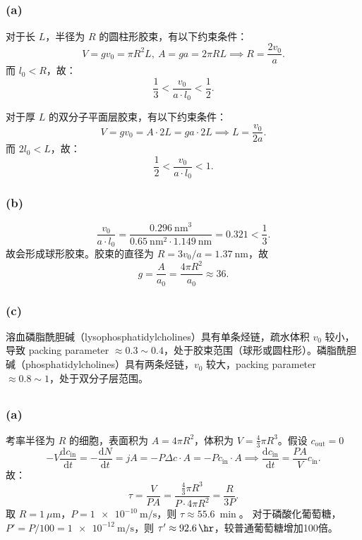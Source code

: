\documentclass[10pt]{article}
\newcommand{\diff}{\mathrm{d}}
\begin{document}
\subsection{}
\subsubsection*{(a)}
对于长 $L$，半径为 $R$ 的圆柱形胶束，有以下约束条件：
$$
V = gv_0 = \pi R^2L, \ A = ga = 2\pi R L \implies R = \frac{2v_0}{a}.
$$
而 $l_0 < R$，故：
$$
\frac{1}{3} < \frac{v_0}{a\cdot l_0 } <\frac{1}{2}.
$$

对于厚 $L$ 的双分子平面层胶束，有以下约束条件：
$$
V =  gv_0 = A\cdot 2L = ga\cdot 2L \implies  L = \frac{v_0}{2a}.
$$
而 $ 2l_0 < L$，故：
$$
\frac{1}{2} < \frac{v_0}{a\cdot l_0} <1.
$$

\subsubsection*{(b)}
$$
\frac{v_0}{a\cdot l_0} = \frac{\qty{0.296}{\nm \cubed}}{ \qty{0.65}{\nm \squared} \cdot \qty{1.149}{\nm}} = 0.321 < \frac{1}{3}.
$$
故会形成球形胶束。胶束的直径为 $R = 3v_0/a = \qty{1.37}{\nm}$，故
$$
g = \frac{A}{a_0} = \frac{4\pi R ^2}{a_0} \approx 36.
$$
\subsubsection*{(c)}
溶血磷脂酰胆碱（lysophosphatidylcholines）具有单条烃链，疏水体积 $v_0$ 较小，导致 packing parameter $ \approx 0.3\sim0.4$，处于胶束范围（球形或圆柱形）。磷脂酰胆碱（phosphatidylcholines）具有两条烃链，$v_0$ 较大，packing parameter $ \approx 0.8\sim1$，处于双分子层范围。

\subsection{}
\subsubsection*{(a)}
考率半径为 $R$ 的细胞，表面积为 $A = 4\pi R^2$，体积为 $V = \frac{4}{3}\pi R^3$。假设 $c_\text{out} = 0$
$$
-V \frac{\diff c_\text{in}}{\diff t} = -\frac{\diff N}{\diff t} = jA = -P \Delta c\cdot A = -Pc_\text{in} \cdot A \implies \frac{\diff c_\text{in}}{\diff t} = \frac{PA}{V} c_\text{in}.
$$
故：
$$\tau = \frac{V}{PA} = \frac{\frac{4}{3}\pi R^3}{P\cdot 4 \pi R^2} = \frac{R}{3P}.
$$
取 $R = \qty{1}{\mu \m}$，$P = \qty{1e-10}{\m \per \s}$，则 $\tau \approx \qty{55.6}{\min}$。
对于磷酸化葡萄糖，$P' = P/100 = \qty{1e-12}{\m \per \s}$，则 $\tau' \approx \qty{92.6}{\hr}$，较普通葡萄糖增加100倍。
\end{document}
